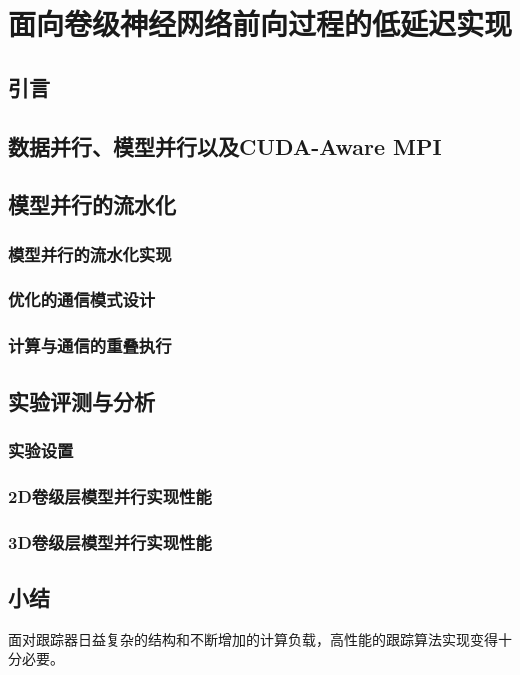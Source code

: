 \chapter{面向卷级神经网络前向过程的低延迟实现}
\section{引言}

\section{数据并行、模型并行以及CUDA-Aware MPI}

\section{模型并行的流水化}

\subsection{模型并行的流水化实现}


\subsection{优化的通信模式设计}


\subsection{计算与通信的重叠执行}

\section{实验评测与分析}

\subsection{实验设置}

\subsection{2D卷级层模型并行实现性能}

\subsection{3D卷级层模型并行实现性能}


\section{小结}
面对跟踪器日益复杂的结构和不断增加的计算负载，高性能的跟踪算法实现变得十分必要。

